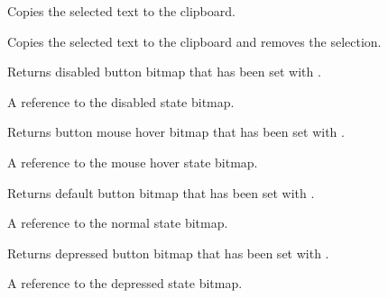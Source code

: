 \label{wxcomboctrlcopy}


Copies the selected text to the clipboard.


\label{wxcomboctrlcut}


Copies the selected text to the clipboard and removes the selection.


\label{wxcomboctrlgetbitmapdisabled}


Returns disabled button bitmap that has been set with
.


A reference to the disabled state bitmap.


\label{wxcomboctrlgetbitmaphover}


Returns button mouse hover bitmap that has been set with
.


A reference to the mouse hover state bitmap.


\label{wxcomboctrlgetbitmapnormal}


Returns default button bitmap that has been set with
.


A reference to the normal state bitmap.


\label{wxcomboctrlgetbitmappressed}


Returns depressed button bitmap that has been set with
.


A reference to the depressed state bitmap.


\label{wxcomboctrlgetbuttonsize}

